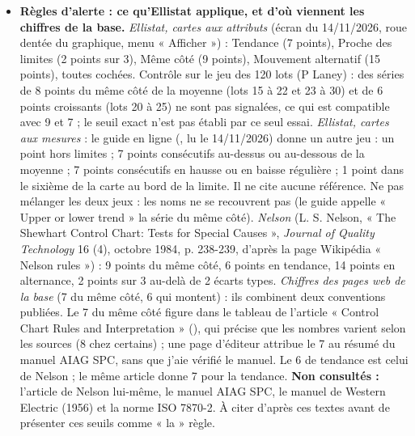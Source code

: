 \documentclass[10pt,a4paper]{article}
\begin{document}
\begin{itemize}
\item \textbf{Règles d'alerte : ce qu'Ellistat applique, et d'où viennent les chiffres de la base.} \textit{Ellistat, cartes aux attributs} (écran du 14/11/2026, roue dentée du graphique, menu « Afficher ») : Tendance (7 points), Proche des limites (2 points sur 3), Même côté (9 points), Mouvement alternatif (15 points), toutes cochées. Contrôle sur le jeu des 120 lots (P Laney) : des séries de 8 points du même côté de la moyenne (lots 15 à 22 et 23 à 30) et de 6 points croissants (lots 20 à 25) ne sont pas signalées, ce qui est compatible avec 9 et 7 ; le seuil exact n'est pas établi par ce seul essai. \textit{Ellistat, cartes aux mesures} : le guide en ligne (, lu le 14/11/2026) donne un autre jeu : un point hors limites ; 7 points consécutifs au-dessus ou au-dessous de la moyenne ; 7 points consécutifs en hausse ou en baisse régulière ; 1 point dans le sixième de la carte au bord de la limite. Il ne cite aucune référence. Ne pas mélanger les deux jeux : les noms ne se recouvrent pas (le guide appelle « Upper or lower trend » la série du même côté). \textit{Nelson} (L. S. Nelson, « The Shewhart Control Chart: Tests for Special Causes », \textit{Journal of Quality Technology} 16 (4), octobre 1984, p. 238-239, d'après la page Wikipédia « Nelson rules ») : 9 points du même côté, 6 points en tendance, 14 points en alternance, 2 points sur 3 au-delà de 2 écarts types. \textit{Chiffres des pages web de la base} (7 du même côté, 6 qui montent) : ils combinent deux conventions publiées. Le 7 du même côté figure dans le tableau de l'article « Control Chart Rules and Interpretation » (), qui précise que les nombres varient selon les sources (8 chez certains) ; une page d'éditeur attribue le 7 au résumé du manuel AIAG SPC, sans que j'aie vérifié le manuel. Le 6 de tendance est celui de Nelson ; le même article donne 7 pour la tendance. \textbf{Non consultés :} l'article de Nelson lui-même, le manuel AIAG SPC, le manuel de Western Electric (1956) et la norme ISO 7870-2. À citer d'après ces textes avant de présenter ces seuils comme « la » règle.

\end{itemize}
\end{document}
